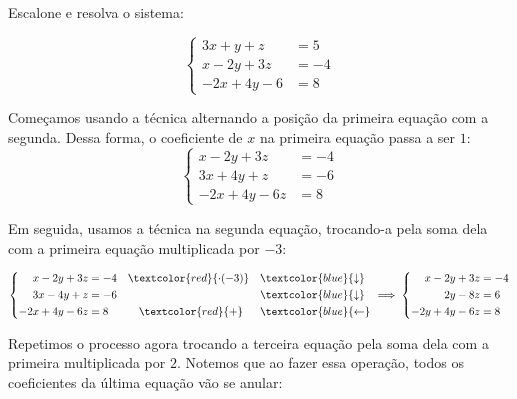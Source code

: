 \begin{example}{}
Escalone e resolva o sistema:

\begin{equation*}
\left \{
\begin{aligned}
3x+y+z&=5\\
x-2y+3z&=-4\\
-2x+4y-6&=8
\end{aligned}
\right.
\end{equation*}

Começamos usando a técnica  alternando a posição da primeira equação com a segunda. Dessa forma, o coeficiente de $x$ na primeira equação passa a ser $1$: 
\begin{equation*}
\left \{
\begin{aligned}
x-2y+3z&=-4\\
3x+4y+z&=-6\\
-2x+4y-6z&=8
\end{aligned}
\right.
\end{equation*}

Em seguida, usamos a técnica  na segunda equação, trocando-a pela soma dela com a primeira equação multiplicada por $-3$:

\begin{equation*}
\left \{
\begin{aligned}
x-2y+3z&=-4 &&\textcolor{red}{\cdot(-3)} &&\vspace{1ex}\textcolor{blue}{\downarrow}\\
3x-4y+z&=-6 &&&&\vspace{1ex}\textcolor{blue}{\downarrow}\\
-2x+4y-6z&=8 &&\quad\textcolor{red}{+}  &&\textcolor{blue}{\leftarrow}
\end{aligned}
\right.
\implies
\left \{
\begin{aligned}
x-2y+3z&=-4\\
2y-8z&=6\\
-2y+4y-6z&=8
\end{aligned}
\right.
\end{equation*}

Repetimos o processo agora trocando a terceira equação pela soma dela com a primeira multiplicada por $2$. Notemos que ao fazer essa operação, todos os coeficientes da última equação vão se anular:


\end{example}
